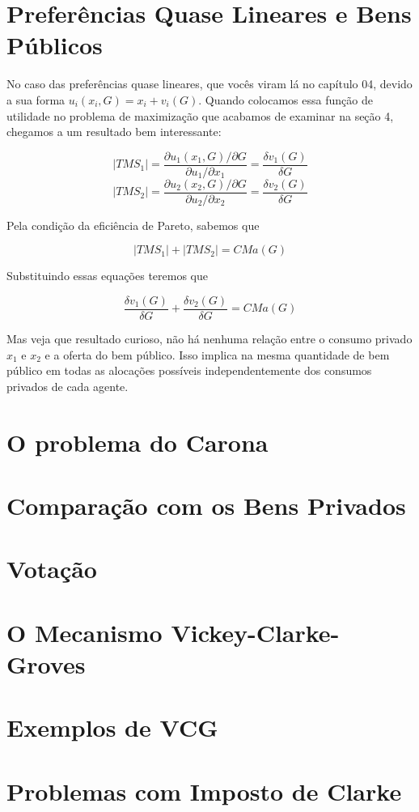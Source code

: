 \documentclass[a4paper,11pt,oneside]{book}
\theoremstyle{definition}
\theoremstyle{break}
\begin{document}
\section{Preferências Quase Lineares e Bens Públicos}

No caso das preferências quase lineares, que vocês viram lá no capítulo 04, devido a sua forma $u_i(x_i,G) = x_i + v_i(G)$. Quando colocamos essa função de utilidade no problema de maximização que acabamos de examinar na seção 4, chegamos a um resultado bem interessante:

$$ |TMS_1| = \frac{\partial u_1(x_1,G) / \partial G}{\partial u_1 / \partial x_1} = \frac{\delta v_1(G)}{\delta G} $$
$$ |TMS_2| = \frac{\partial u_2(x_2,G) / \partial G}{\partial u_2 / \partial x_2} = \frac{\delta v_2(G)}{\delta G} $$

Pela condição da eficiência de Pareto, sabemos que

$$ |TMS_1| + |TMS_2| =  CMa(G) $$

Substituindo essas equações teremos que

$$ \frac{\delta v_1(G)}{\delta G} + \frac{\delta v_2(G)}{\delta G} = CMa(G) $$

Mas veja que resultado curioso, não há nenhuma relação entre o consumo privado $x_1$ e $x_2$ e a oferta do bem público. Isso implica na mesma quantidade de bem público em todas as alocações possíveis independentemente dos consumos privados de cada agente.

\section{O problema do Carona}
\section{Comparação com os Bens Privados}
\section{Votação}
\section{O Mecanismo Vickey-Clarke-Groves}
\section{Exemplos de VCG}
\section{Problemas com Imposto de Clarke}
\end{document}

